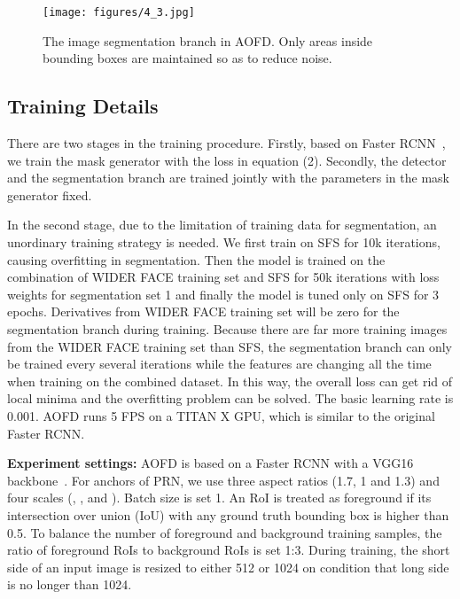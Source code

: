 \documentclass[10pt,twocolumn,letterpaper]{article}
\begin{document}
\begin{figure}[t]
	\begin{center}
		\texttt{[image: figures/4\_3.jpg]}
	\end{center}
	\vspace{-6pt}
	\caption{The image segmentation branch in AOFD. Only areas inside bounding boxes are maintained so as to reduce noise.}
	\vspace{-10pt}
	\label{fig:segmentation}
\end{figure}


\subsection{Training Details}
There are two stages in the training procedure. Firstly, based on Faster RCNN~\cite{ren2015faster}, we train the mask generator with the loss in equation (2). Secondly, the detector and the segmentation branch are trained jointly with the parameters in the mask generator fixed. 

In the second stage, due to the limitation of training data for segmentation, an unordinary training strategy is needed. We first train on SFS for 10k iterations, causing overfitting in segmentation. Then the model is trained on the combination of WIDER FACE training set and SFS for 50k iterations with loss weights for segmentation set 1 and finally the model is tuned only on SFS for 3 epochs. Derivatives from WIDER FACE training set will be zero for the segmentation branch during training. Because there are far more training images from the WIDER FACE training set than SFS, the segmentation branch can only be trained every several iterations while the features are changing all the time when training on the combined dataset. In this way, the overall loss can get rid of local minima and the overfitting problem can be solved. The basic learning rate is 0.001. AOFD runs 5 FPS on a TITAN X GPU, which is similar to the original Faster RCNN.

\textbf{Experiment settings:} AOFD is based on a Faster RCNN with a VGG16 backbone~\cite{simonyan2014very}. For anchors of PRN, we use three aspect ratios (1.7, 1 and 1.3) and four scales (, ,  and ). Batch size is set 1. An RoI is treated as foreground if its intersection over union (IoU) with any ground truth bounding box is higher than 0.5. To balance the number of foreground and background training samples, the ratio of foreground RoIs to background RoIs is set 1:3. During training, the short side of an input image is resized to either 512 or 1024 on condition that long side is no longer than 1024. 
\end{document}
